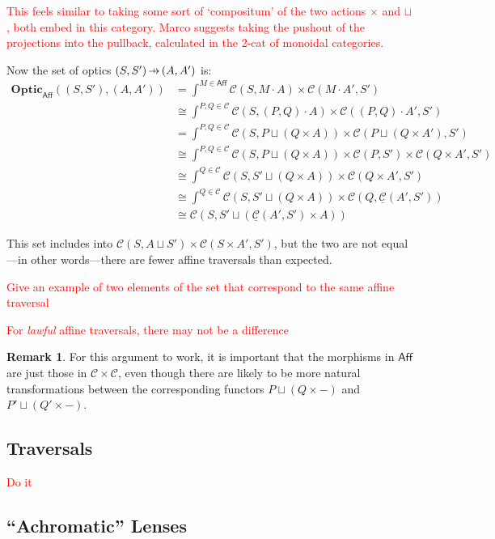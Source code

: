\documentclass[11pt,a4paper]{article}
\theoremstyle{plain}
\theoremstyle{definition}
\newtheorem{remark}[theorem]{Remark}
\newcommand{\C}{\mathscr{C}}
\newcommand{\homC}{\underline{\C}}
\newcommand{\Optic}{\mathbf{Optic}}
\newcommand{\hto}{\ensuremath{\,\mathaccent\shortmid\rightarrow\,}}
\newcommand{\todo}[1]{\textcolor{red}{\small #1}}
\begin{document}
\todo{This feels similar to taking some sort of `compositum' of the two actions $\times$ and $\sqcup$, both embed in this category. Marco suggests taking the pushout of the projections into the pullback, calculated in the 2-cat of monoidal categories.}

Now the set of optics $(S, S') \hto (A, A')$ is:
\begin{align*}
\Optic_{\mathsf{Aff}}((S, S'), (A, A')) 
&= \int^{M \in \mathsf{Aff}} \C(S, M \cdot A) \times \C(M \cdot A', S') \\
&\cong \int^{P,Q \in \C} \C(S, (P,Q) \cdot A) \times \C((P,Q) \cdot A', S') \\
&= \int^{P,Q \in \C} \C(S, P \sqcup (Q \times A)) \times \C(P \sqcup (Q \times A'), S') \\
&\cong \int^{P,Q \in \C} \C(S, P \sqcup (Q \times A)) \times \C(P,S') \times \C(Q \times A', S') \\
&\cong \int^{Q \in \C} \C(S, S' \sqcup (Q \times A)) \times \C(Q \times A', S') \\
&\cong \int^{Q \in \C} \C(S, S' \sqcup (Q \times A)) \times \C(Q, \homC(A', S')) \\
&\cong \C(S, S' \sqcup (\homC(A', S') \times A))
\end{align*}

This set includes into $\C(S, A \sqcup S') \times \C(S\times A', S')$, but the two are not equal---in other words---there are fewer affine traversals than expected.

\todo{Give an example of two elements of the set that correspond to the same affine traversal}

\todo{For \emph{lawful} affine traversals, there may not be a difference}

\begin{remark}
For this argument to work, it is important that the morphisms in $\mathsf{Aff}$ are just those in $\C \times \C$, even though there are likely to be more natural transformations between the corresponding functors $P \sqcup (Q \times -)$ and $P' \sqcup (Q' \times -)$.
\end{remark}

\subsection{Traversals}
\todo{Do it}

\subsection{``Achromatic'' Lenses}
\end{document}
